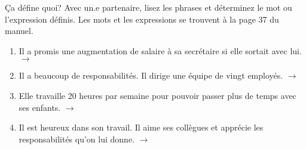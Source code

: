 \begin{frame}{Ça défine quoi?}
  Avec un.e partenaire, lisez les phrases et déterminez le mot ou l'expression définis.
  Les mots et les expressions se trouvent à la page 37 du manuel.
  \begin{enumerate}
    \item Il a promis une augmentation de salaire à sa secrétaire si elle sortait avec lui. \hfill $\to$ \underline{}
    \item Il a beaucoup de responsabilités. Il dirige une équipe de vingt employés. \hfill $\to$ \underline{}
    \item Elle travaille 20 heures par semaine pour pouvoir passer plus de temps avec ses enfants. \hfill $\to$ \underline{}
    \item Il est heureux dans son travail. Il aime ses collègues et apprécie les responsabilités qu'on lui donne. \hfill $\to$ \underline{}
  \end{enumerate}
\end{frame}
